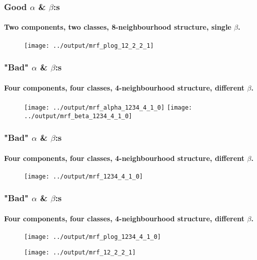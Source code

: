 \documentclass[12pt, english]{beamer}
\begin{document}
\begin{frame}
  \frametitle{Good $\alpha$ \& $\beta$:s}
  \framesubtitle{Two components, two classes, 8-neighbourhood structure, single $\beta$.}

\begin{figure}
\centering
\texttt{[image: ../output/mrf\_plog\_12\_2\_2\_1]}
    \caption*{}
    \label{fig:plog}
\end{figure}
\end{frame}



\begin{frame}
  \frametitle{"Bad" $\alpha$ \& $\beta$:s}
  \framesubtitle{Four components, four classes, 4-neighbourhood structure, different $\beta$.}

\begin{figure}
\centering
\texttt{[image: ../output/mrf\_alpha\_1234\_4\_1\_0]}
\texttt{[image: ../output/mrf\_beta\_1234\_4\_1\_0]}
    \caption*{}
    \label{fig:alphabeta}
\end{figure}
\end{frame}

\begin{frame}
  \frametitle{"Bad" $\alpha$ \& $\beta$:s}
  \framesubtitle{Four components, four classes, 4-neighbourhood structure, different $\beta$.}

\begin{figure}
\centering
\texttt{[image: ../output/mrf\_1234\_4\_1\_0]}
    \caption*{}
    \label{fig:mrf}
\end{figure}
\end{frame}

\begin{frame}
  \frametitle{"Bad" $\alpha$ \& $\beta$:s}
  \framesubtitle{Four components, four classes, 4-neighbourhood structure, different $\beta$.}

\begin{figure}
\centering
\texttt{[image: ../output/mrf\_plog\_1234\_4\_1\_0]}
    \caption*{}
    \label{fig:mrf}
\end{figure}
\end{frame}



\begin{frame}
\begin{figure}[h]
\centering

\begin{minipage}{1.0\textwidth}
\centering
\end{minipage}

\begin{minipage}{1.0\textwidth}
\centering
\texttt{[image: ../output/mrf\_12\_2\_2\_1]}
\caption*{}
\label{fig:brain}
\end{minipage}

\end{figure}
\end{frame}

\end{document}
